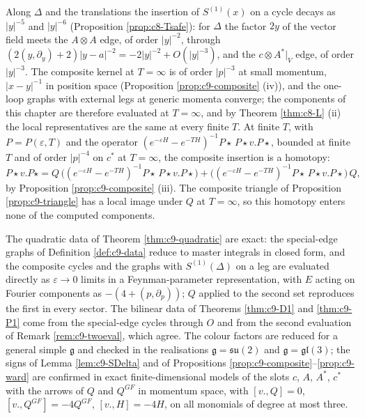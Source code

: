 \begin{remark}
\label{rem:c9-endpoint}
Along $\Delta$ and the translations the insertion of $S^{(1)}(x)$ on a cycle decays as $|y|^{-5}$ and $|y|^{-6}$ (Proposition \ref{prop:c8-Tsafe}): for $\Delta$ the factor $2y$ of the vector field meets the $A\otimes A$ edge, of order $|y|^{-2}$, through $(2(y,\partial_y)+2)|y-a|^{-2}=-2|y|^{-2}+O(|y|^{-3})$, and the $c\otimes A^*|_V$ edge, of order $|y|^{-3}$. The composite kernel at $T=\infty$ is of order $|p|^{-3}$ at small momentum, $|x-y|^{-1}$ in position space (Proposition \ref{prop:c9-composite} (iv)), and the one-loop graphs with external legs at generic momenta converge; the components of this chapter are therefore evaluated at $T=\infty$, and by Theorem \ref{thm:c8-L} (ii) the local representatives are the same at every finite $T$. At finite $T$, with $P=P(\varepsilon,T)$ and the operator $(e^{-\varepsilon H}-e^{-TH})^{-1}P\star\,P\star v.P\star$, bounded at finite $T$ and of order $|p|^{-4}$ on $c^*$ at $T=\infty$, the composite insertion is a homotopy:
\[
P\star v.P\star=Q\,\big((e^{-\varepsilon H}-e^{-TH})^{-1}P\star\,P\star v.P\star\big)+\big((e^{-\varepsilon H}-e^{-TH})^{-1}P\star\,P\star v.P\star\big)\,Q,
\]
by Proposition \ref{prop:c9-composite} (iii). The composite triangle of Proposition \ref{prop:c9-triangle} has a local image under $Q$ at $T=\infty$, so this homotopy enters none of the computed components.
\end{remark}

\begin{remark}
\label{rem:c9-methodD}
The quadratic data of Theorem \ref{thm:c9-quadratic} are exact: the special-edge graphs of Definition \ref{def:c9-data} reduce to master integrals in closed form, and the composite cycles and the graphs with $S^{(1)}(\Delta)$ on a leg are evaluated directly as $\varepsilon\to0$ limits in a Feynman-parameter representation, with $E$ acting on Fourier components as $-(4+(p,\partial_p))$; $Q$ applied to the second set reproduces the first in every sector. The bilinear data of Theorems \ref{thm:c9-D1} and \ref{thm:c9-P1} come from the special-edge cycles through $O$ and from the second evaluation of Remark \ref{rem:c9-twoeval}, which agree. The colour factors are reduced for a general simple $\mathfrak g$ and checked in the realisations $\mathfrak g=\mathfrak{su}(2)$ and $\mathfrak g=\mathfrak{gl}(3)$; the signs of Lemma \ref{lem:c9-SDelta} and of Propositions \ref{prop:c9-composite}--\ref{prop:c9-ward} are confirmed in exact finite-dimensional models of the slots $c$, $A$, $A^*$, $c^*$ with the arrows of $Q$ and $Q^{GF}$ in momentum space, with $[v.,Q]=0$, $[v.,Q^{GF}]=-4Q^{GF}$, $[v.,H]=-4H$, on all monomials of degree at most three.
\end{remark}

